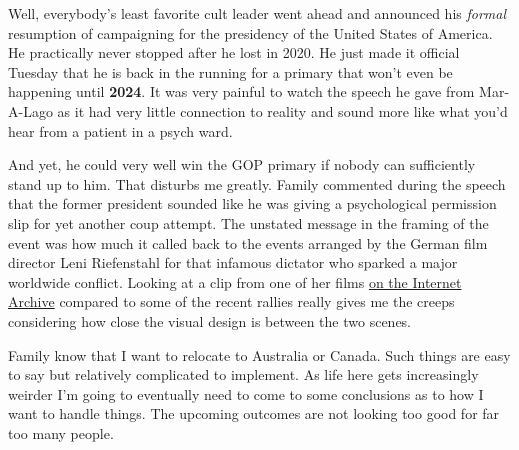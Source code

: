 Well, everybody's least favorite cult leader went ahead and announced
his \emph{formal} resumption of campaigning for the presidency of the
United States of America. He practically never stopped after he lost in
2020. He just made it official Tuesday that he is back in the running
for a primary that won't even be happening until \textbf{2024}. It was
very painful to watch the speech he gave from Mar-A-Lago as it had very
little connection to reality and sound more like what you'd hear from a
patient in a psych ward.

And yet, he could very well win the GOP primary if nobody can
sufficiently stand up to him. That disturbs me greatly. Family commented
during the speech that the former president sounded like he was giving a
psychological permission slip for yet another coup attempt. The unstated
message in the framing of the event was how much it called back to the
events arranged by the German film director Leni Riefenstahl for that
infamous dictator who sparked a major worldwide conflict. Looking at a
clip from one of her films
\href{https://archive.org/details/hitler-delivers-speech-at-nuremberg-night-rally-1934}{on
the Internet Archive} compared to some of the recent rallies really
gives me the creeps considering how close the visual design is between
the two scenes.

Family know that I want to relocate to Australia or Canada. Such things
are easy to say but relatively complicated to implement. As life here
gets increasingly weirder I'm going to eventually need to come to some
conclusions as to how I want to handle things. The upcoming outcomes are
not looking too good for far too many people.
